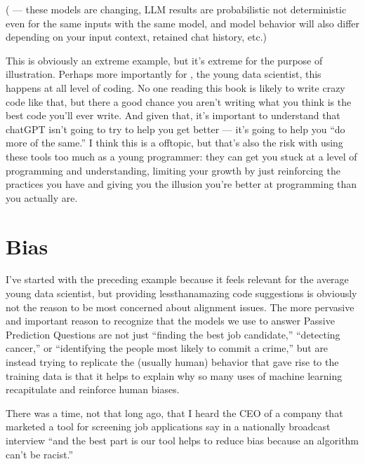 \documentclass[letterpaper,10pt,english]{jupyterBook}
\begin{document}
\sphinxAtStartPar
{}

\sphinxAtStartPar
( — these models are  changing, LLM results are probabilistic not deterministic even for the same inputs with the same model, and model behavior will also differ depending on your input context, retained chat history, etc.)

\sphinxAtStartPar
This is obviously an extreme example, but it’s extreme for the purpose of illustration. Perhaps more importantly for , the young data scientist, this happens at all level of coding. No one reading this book is likely to write crazy code like that, but there  a good chance you aren’t writing what you think is the best code you’ll ever write. And given that, it’s important to understand that chatGPT isn’t going to try to help you get better — it’s going to help you “do more of the same.” I think this is a  off\sphinxhyphen{}topic, but that’s also the risk with using these tools too much as a young programmer: they can get you stuck at a level of programming and understanding, limiting your growth by just reinforcing the practices you have and giving you the illusion you’re better at programming than you actually are.


\section{Bias}
\label{\detokenize{30_questions/23_passive_internal_alignment_and_bias:bias}}
\sphinxAtStartPar
I’ve started with the preceding example because it feels relevant for the average young data scientist, but providing less\sphinxhyphen{}than\sphinxhyphen{}amazing code suggestions is obviously not the reason to be most concerned about alignment issues. The more pervasive and important reason to recognize that the models we use to answer Passive Prediction Questions are not just “finding the best job candidate,” “detecting cancer,” or “identifying the people most likely to commit a crime,” but are instead trying to replicate the (usually human) behavior that gave rise to the training data is that it helps to explain why so many uses of machine learning recapitulate and reinforce human biases.

\sphinxAtStartPar
There was a time, not that long ago, that I heard the CEO of a company that marketed a tool for screening job applications say in a nationally broadcast interview “and the best part is our tool helps to reduce bias because an algorithm can’t be racist.”
\end{document}
